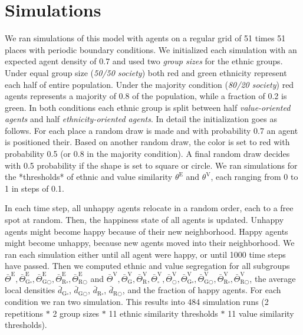 \documentclass{ws-acs}
\begin{document}
\section{Simulations}
We ran simulations of this model with agents on a regular grid of 51 times 51 places with periodic boundary conditions. We initialized each simulation with an expected agent density of 0.7 and used two {\it group sizes} for the ethnic groups. Under equal group size ({\it 50/50 society}) both red and green ethnicity represent each half of entire population. Under the majority condition ({\it 80/20 society}) red agents represents a majority of 0.8 of the population, while a fraction of 0.2 is green. In both conditions each ethnic group is split between half {\it value-oriented agents} and half {\it ethnicity-oriented agents}. In detail the initialization goes as follows. For each place a random draw is made and with probability 0.7 an agent is positioned their. Based on another random draw, the color is set to red with probability 0.5 (or 0.8 in the majority condition). A final random draw decides with 0.5 probability if the shape is set to square or circle. We ran simulations for the *thresholds* of ethnic and value similarity $\theta^\text{E}$ and $\theta^\text{V}$, each ranging from 0 to 1 in steps of 0.1. 

In each time step, all unhappy agents relocate in a random order, each to a free spot at random. Then, the happiness state of all agents is updated. Unhappy agents might become happy because of their new neighborhood. Happy agents might become unhappy, because new agents moved into their neighborhood. We ran each simulation either until all agent were happy, or until 1000 time steps have passed. Then we computed ethnic and value segregation for all subgroups $\bar\Theta^\text{E}, \bar\Theta^\text{E}_{\text{G}\square}, \bar\Theta^\text{E}_{\text{G}\bigcirc}, \bar\Theta^\text{E}_{\text{R}\square}, \bar\Theta^\text{E}_{\text{R}\bigcirc}$ and $\bar\Theta^\text{V}, \bar\Theta^\text{V}_{\text{G}}, \bar\Theta^\text{V}_{\text{R}}, \bar\Theta^\text{V}_{\square}, \bar\Theta^\text{V}_{\bigcirc}, \bar\Theta^\text{V}_{\text{G}\square}, \bar\Theta^\text{V}_{\text{G}\bigcirc}, \bar\Theta^\text{V}_{\text{R}\square}, \bar\Theta^\text{V}_{\text{R}\bigcirc}$, the average local densities $\bar d_{\text{G}\square}$, $\bar d_{\text{G}\bigcirc}$, $\bar d_{\text{R}\square}$, $\bar d_{\text{R}\bigcirc}$, and the fraction of happy agents. 
For each condition we ran two simulation. This results into 484 simulation runs (2 repetitions $*$ 2 group sizes $*$ 11 ethnic similarity thresholds $*$ 11 value similarity thresholds).
\end{document}
